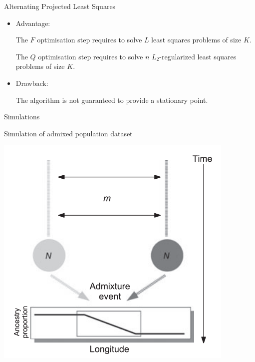 \documentclass{beamer}\usepackage[]{graphicx}\usepackage[]{color}
\begin{document}
\begin{frame}{Alternating Projected Least Squares}

\begin{itemize}

\item Advantage:

The $F$ optimisation step requires to solve $L$ least squares problems of size $K$.

The $Q$ optimisation step requires to solve $n$ $L_2$-regularized least squares problems of size $K$.

\item Drawback:

The algorithm is not guaranteed to provide a stationary point.

\end{itemize}

\end{frame}

\begin{frame}{Simulations}

Simulation of admixed population dataset~\citep{franccois2010spatially}
\begin{center}
\includegraphics[width=.70\linewidth]{addmixed.png}
\end{center}

\end{frame}

\end{document}
